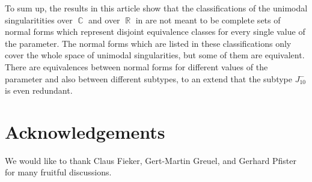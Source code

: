 \documentclass[noend]{amsproc}
\theoremstyle{definition}
\DeclareMathOperator{\R}{\mathbb{R}}
\DeclareMathOperator{\C}{\mathbb{C}}
\begin{document}
To sum up, the results in this article show that the classifications of the
unimodal singularitities over $\C$ and over $\R$ in \citet{AVG1985} are not
meant to be complete sets of normal forms which represent disjoint equivalence
classes for every single value of the parameter. The normal forms which are
listed in these classifications only cover the whole space of unimodal
singularities, but some of them are equivalent. There are equivalences between
normal forms for different values of the parameter and also between different
subtypes, to an extend that the subtype $J_{10}^-$ is even redundant.


\section{Acknowledgements}

We would like to thank Claus Fieker, Gert-Martin Greuel, and Gerhard Pfister
for many fruitful discussions.


\clearpage
\end{document}
